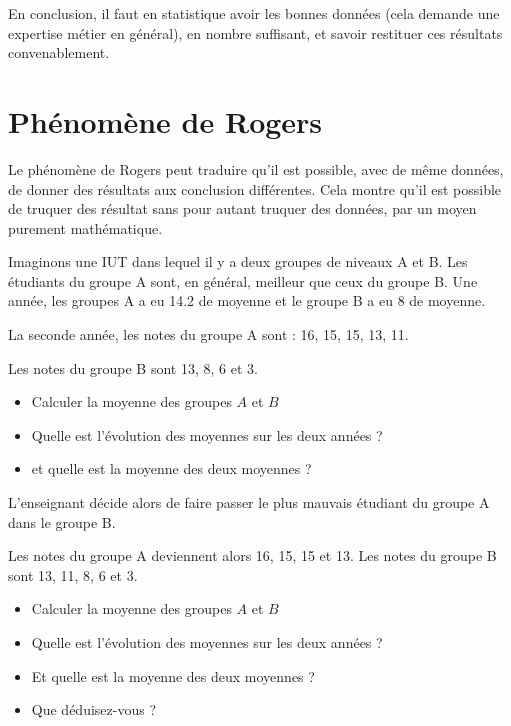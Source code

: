 \documentclass[10pt, a4paper]{article}
\begin{document}
En conclusion, il faut en statistique avoir les bonnes données
(cela demande une expertise métier en général), en nombre suffisant, et savoir restituer ces résultats convenablement.
\newpage
\section{Phénomène de Rogers}

Le phénomène de Rogers peut traduire qu’il est possible, avec de même données, de donner des résultats aux conclusion différentes. Cela montre qu’il est possible de truquer des résultat sans pour autant truquer des données,
par un moyen purement mathématique. 


\begin{tcolorbox}[lefttitle=1cm, colframe=gray!75!black, colback=white, title=\textbf{EXERCICE 5}]


Imaginons une IUT dans lequel il y a deux groupes de niveaux A et B. Les
étudiants du groupe A sont, en général, meilleur que ceux du groupe B. Une année, les groupes A a eu 14.2 de moyenne et le groupe B a eu 8 de moyenne.

La seconde année, les notes du groupe A sont : 16, 15, 15, 13, 11. 

Les notes du groupe B sont 13, 8, 6 et 3. 


\begin{tcolorbox}[lefttitle=1cm, colframe=gray!75!black, colback=white, title=\textbf{EXERCICE 5.1}]

\begin{itemize}
    \item Calculer la moyenne des groupes $A$ et $B$ 
    \item Quelle est l'évolution des moyennes sur les deux années ? 
    \item et quelle est la moyenne des deux moyennes ? 
\end{itemize}
\vspace{1cm}
\end{tcolorbox}

L’enseignant décide alors de faire passer le plus mauvais étudiant du groupe A dans le groupe B.

\begin{tcolorbox}[lefttitle=1cm, colframe=gray!75!black, colback=white, title=\textbf{EXERCICE 5.2}]


Les notes du groupe A deviennent alors 16, 15, 15 et 13.
Les notes du groupe B sont 13, 11, 8, 6 et 3. 
\begin{itemize}
    \item Calculer la moyenne des groupes $A$ et $B$ 
    \item Quelle est l'évolution des moyennes sur les deux années ?
    \item Et quelle est la moyenne des deux moyennes ?  
    \item Que déduisez-vous ?
\end{itemize}
\vspace{3cm}

\end{tcolorbox}

\end{tcolorbox}
\end{document}
